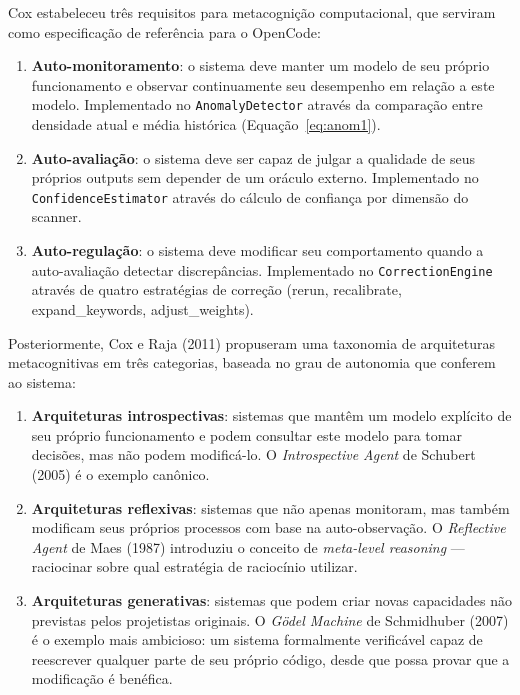 Cox estabeleceu três requisitos para metacognição computacional, que serviram como especificação de referência para o OpenCode:

\begin{enumerate}
    \item \textbf{Auto-monitoramento}: o sistema deve manter um modelo de seu próprio funcionamento e observar continuamente seu desempenho em relação a este modelo. Implementado no \texttt{AnomalyDetector} através da comparação entre densidade atual e média histórica (Equação~\ref{eq:anom1}).
    \item \textbf{Auto-avaliação}: o sistema deve ser capaz de julgar a qualidade de seus próprios outputs sem depender de um oráculo externo. Implementado no \texttt{ConfidenceEstimator} através do cálculo de confiança por dimensão do scanner.
    \item \textbf{Auto-regulação}: o sistema deve modificar seu comportamento quando a auto-avaliação detectar discrepâncias. Implementado no \texttt{CorrectionEngine} através de quatro estratégias de correção (rerun, recalibrate, expand\_keywords, adjust\_weights).
\end{enumerate}

Posteriormente, Cox e Raja (2011) propuseram uma taxonomia de arquiteturas metacognitivas em três categorias, baseada no grau de autonomia que conferem ao sistema:

\begin{enumerate}
    \item \textbf{Arquiteturas introspectivas}: sistemas que mantêm um modelo explícito de seu próprio funcionamento e podem consultar este modelo para tomar decisões, mas não podem modificá-lo. O \textit{Introspective Agent} de Schubert (2005) é o exemplo canônico.
    \item \textbf{Arquiteturas reflexivas}: sistemas que não apenas monitoram, mas também modificam seus próprios processos com base na auto-observação. O \textit{Reflective Agent} de Maes (1987) introduziu o conceito de \textit{meta-level reasoning} — raciocinar sobre qual estratégia de raciocínio utilizar.
    \item \textbf{Arquiteturas generativas}: sistemas que podem criar novas capacidades não previstas pelos projetistas originais. O \textit{Gödel Machine} de Schmidhuber (2007) é o exemplo mais ambicioso: um sistema formalmente verificável capaz de reescrever qualquer parte de seu próprio código, desde que possa provar que a modificação é benéfica.
\end{enumerate}

